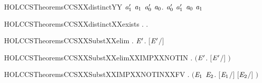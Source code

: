 \begin{SaveVerbatim}{HOLCCSTheoremsCCSXXdistinctYY}
   \HOLSymConst{\HOLTokenForall{}}\ensuremath{\HOLBoundVar{a}\sb{\mathrm{1}}\sp{\prime}} \ensuremath{\HOLBoundVar{a}\sb{\mathrm{1}}} \ensuremath{\HOLBoundVar{a}\sb{\mathrm{0}}\sp{\prime}} \ensuremath{\HOLBoundVar{a}\sb{\mathrm{0}}}.  \ensuremath{\HOLBoundVar{a}\sb{\mathrm{0}}\sp{\prime}} \ensuremath{\HOLBoundVar{a}\sb{\mathrm{1}}\sp{\prime}} \HOLSymConst{\HOLTokenNotEqual{}}  \ensuremath{\HOLBoundVar{a}\sb{\mathrm{0}}} \ensuremath{\HOLBoundVar{a}\sb{\mathrm{1}}}
\end{SaveVerbatim}
\newcommand{\HOLCCSTheoremsCCSXXdistinctYY}{\UseVerbatim{HOLCCSTheoremsCCSXXdistinctYY}}
\begin{SaveVerbatim}{HOLCCSTheoremsCCSXXdistinctXXexists}
\HOLTokenTurnstile{} \HOLSymConst{\HOLTokenForall{}}. \HOLSymConst{\HOLTokenExists{}}.  \HOLSymConst{\HOLTokenNotEqual{}} 
\end{SaveVerbatim}
\newcommand{\HOLCCSTheoremsCCSXXdistinctXXexists}{\UseVerbatim{HOLCCSTheoremsCCSXXdistinctXXexists}}
\begin{SaveVerbatim}{HOLCCSTheoremsCCSXXSubstXXelim}
\HOLTokenTurnstile{} \HOLSymConst{\HOLTokenForall{}} .  \HOLConst{\HOLTokenNotIn{}}   \HOLSymConst{\HOLTokenImp{}} \HOLSymConst{\HOLTokenForall{}}\ensuremath{\HOLBoundVar{E}\sp{\prime}}. \ensuremath{[}\ensuremath{\HOLBoundVar{E}\sp{\prime}}\ensuremath{/}\ensuremath{]}  \HOLSymConst{\ensuremath{=}} 
\end{SaveVerbatim}
\newcommand{\HOLCCSTheoremsCCSXXSubstXXelim}{\UseVerbatim{HOLCCSTheoremsCCSXXSubstXXelim}}
\begin{SaveVerbatim}{HOLCCSTheoremsCCSXXSubstXXelimXXIMPXXNOTIN}
\HOLTokenTurnstile{} \HOLSymConst{\HOLTokenForall{}} . \ensuremath{(}\HOLSymConst{\HOLTokenForall{}}\ensuremath{\HOLBoundVar{E}\sp{\prime}}. \ensuremath{[}\ensuremath{\HOLBoundVar{E}\sp{\prime}}\ensuremath{/}\ensuremath{]}  \HOLSymConst{\ensuremath{=}} \ensuremath{)} \HOLSymConst{\HOLTokenImp{}}  \HOLConst{\HOLTokenNotIn{}}  
\end{SaveVerbatim}
\newcommand{\HOLCCSTheoremsCCSXXSubstXXelimXXIMPXXNOTIN}{\UseVerbatim{HOLCCSTheoremsCCSXXSubstXXelimXXIMPXXNOTIN}}
\begin{SaveVerbatim}{HOLCCSTheoremsCCSXXSubstXXIMPXXNOTINXXFV}
\HOLTokenTurnstile{} \HOLSymConst{\HOLTokenForall{}} . \ensuremath{(}\HOLSymConst{\HOLTokenForall{}}\ensuremath{\HOLBoundVar{E}\sb{\mathrm{1}}} \ensuremath{\HOLBoundVar{E}\sb{\mathrm{2}}}. \ensuremath{[}\ensuremath{\HOLBoundVar{E}\sb{\mathrm{1}}}\ensuremath{/}\ensuremath{]}  \HOLSymConst{\ensuremath{=}} \ensuremath{[}\ensuremath{\HOLBoundVar{E}\sb{\mathrm{2}}}\ensuremath{/}\ensuremath{]} \ensuremath{)} \HOLSymConst{\HOLTokenImp{}}  \HOLConst{\HOLTokenNotIn{}}  
\end{SaveVerbatim}
